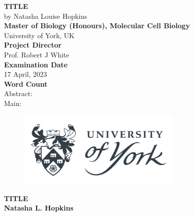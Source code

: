 \documentclass[
  12pt,
]{article}
\author{}
\date{\vspace{-2.5em}}
\begin{document}
\captionsetup{justification=raggedright,singlelinecheck=false}

\begin{center}
\vspace*{2\baselineskip}
\Huge
\textbf{TITLE}\\
\vspace*{1\baselineskip}
\Large{by Natasha Louise Hopkins}\\
\vspace*{2\baselineskip}
\Large{\textbf{Master of Biology (Honours), Molecular Cell Biology}}\\
\Large{University of York, UK}\\
\vspace*{2\baselineskip}
\Large{\textbf{Project Director}}\\
Prof. Robert J White\\
\vspace*{2\baselineskip}
\Large{\textbf{Examination Date}}\\
17 April, 2023\\
\vspace*{2\baselineskip}
\Large{\textbf{Word Count}}\\
Abstract: \\
Main: \\
\vspace*{2\baselineskip}
\begin{figure}[h!]
\centering
  \includegraphics[width=8cm]{../images/uoy_logo.png}
  \label{}
\end{figure}
\end{center}

\hypersetup{linkcolor = black}
\newpage
\tableofcontents
\hypersetup{linkcolor = teal}
\newpage
\setlength{\columnsep}{25pt}
\linespread{2}
\setlength{\parindent}{0pt}
\huge
\textbf{TITLE}\\
\normalsize
\textbf{Natasha L. Hopkins}\\
\end{document}

